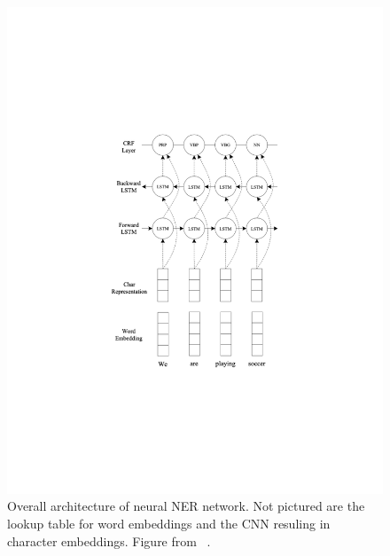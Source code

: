 \begin{figure}[h]
    \centering
    \begin{minipage}[t]{0.5\textwidth}
    	\centering
    	\includegraphics[width=.95\linewidth]{LatexDiss/figures/blstmcrf.pdf}
    	\caption{Overall architecture of neural NER network. Not pictured are the lookup table for word embeddings and the CNN resuling in character embeddings. Figure from ~\citep{DBLP:conf/acl/MaH16}.} %
    	\label{fig:blstmcrf}
    \end{minipage}\hfill
    \begin{minipage}[t]{0.5\textwidth}
    	\centering

\end{minipage}
\end{figure}
